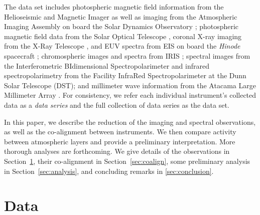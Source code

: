 \documentclass[twocolumn]{aastex62}
\begin{document}
The data set includes photospheric magnetic field information from the Helioseismic and Magnetic Imager \citep[HMI,][]{2012SchouEA_HMI} as well as imaging from the Atmospheric Imaging Assembly \citep[AIA,][]{2012LemenEA_AIA} on board the Solar Dynamics Observatory \citep[SDO,][]{2012PesnellEA_SDO}; photospheric magnetic field data from the Solar Optical Telescope \citep[SOT,][]{2008TsunetaEA_SOT}, coronal X-ray imaging from the X-Ray Telescope \citep[XRT,][]{2007GolubEA_XRT}, and EUV spectra from EIS \citep{2007CulhaneEA_EIS} on board the {\it Hinode} spacecraft \citep[][]{2007KosugiEA_Hinode}; chromospheric images and spectra from IRIS \citep{2014DePontieuEA_IRIS}; spectral images from the  Interferometric BIdimensional Spectropolarimeter \citep[IBIS,][]{2006Cavallini_IBIS} and infrared spectropolarimetry from the Facility InfraRed Spectropolarimeter \citep[FIRS,][]{2010JaeggliEA_FIRS} at the Dunn Solar Telescope (DST); and millimeter wave information from the Atacama Large Millimeter Array \citep[ALMA,][]{2009WootenThompson_ALMA, 2010HillsEA_ALMA2}.  For consistency, we refer each individual instrument's collected data as a \emph{data series} and the full collection of data series as the data set.

In this paper, we describe the reduction of the imaging and spectral observations, as well as the co-alignment between instruments. 
We then compare activity between atmospheric layers and provide a preliminary interpretation. 
More thorough analyses are forthcoming. 
We give details of the observations in Section~\ref{sec:data}, their co-alignment in Section~\ref{sec:coalign}, some preliminary analysis in Section~\ref{sec:analysis}, and concluding remarks in \ref{sec:conclusion}. 

\section{Data} \label{sec:data}
\end{document}
